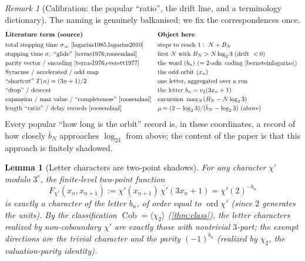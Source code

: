 \documentclass[11pt]{article}
\theoremstyle{plain}
\newtheorem{lemma}{Lemma}
\theoremstyle{definition}
\theoremstyle{remark}
\newtheorem*{remark}{Remark}
\begin{document}
\begin{remark}[Calibration: the popular ``ratio'', the drift line, and a
terminology dictionary]
The naming is genuinely balkanised; we fix the correspondences once.
\[
\renewcommand{\arraystretch}{1.2}
\begin{array}{@{}lll@{}}
\textbf{Literature term (source)} & \textbf{Object here} \\[2pt]
\text{total stopping time }\sigma_\infty\ \text{\cite{lagarias1985,lagarias2010}}
   & \text{steps to reach }1:\ N+B_N \\
\text{stopping time }\sigma,\ \text{``glide''\ \cite{terras1976,roosendaal}}
   & \text{first }N\text{ with }B_N>N\log_23\ (\text{drift }<0) \\
\text{parity vector / encoding \cite{terras1976,everett1977}}
   & \text{the word }(b_n)\ (=\text{$2$-adic coding \cite{bernsteinlagarias}}) \\
\text{Syracuse / accelerated / odd map}
   & \text{the odd orbit }(x_n) \\
\text{``shortcut'' }T(n)=(3n+1)/2
   & \text{one letter, aggregated over a run} \\
\text{``drop'' / descent}
   & \text{the letter }b_n=v_2(3x_n+1) \\
\text{expansion / max value / ``completeness''\ \cite{roosendaal}}
   & \text{excursion }\max_N(B_N-N\log_23) \\
\text{length ``ratio'' / delay records \cite{roosendaal}}
   & \rho=(2-\log_23)/(\bar b_N-\log_23)\ \text{(above)} \\
\end{array}
\]
Every popular ``how long is the orbit'' record is, in these coordinates,
a record of how closely $\bar b_N$ approaches $\log_23$ from above; the
content of the paper is that this approach is finitely shadowed.
\end{remark}

\begin{lemma}[Letter characters are two-point shadows]\label{lem:lettershadow}
For any character $\chi'$ modulo $3^r$, the finite-level two-point
function
\[
F_{\chi'}(x_n,x_{n+1}):=\chi'(x_{n+1})\,\overline{\chi'}(3x_n+1)
=\chi'(2)^{-b_n}
\]
is exactly a character of the letter $b_n$, of order equal to
$\operatorname{ord}\chi'$ (since $2$ generates the units). By the
classification $\operatorname{Cob}=\langle\chi_2\rangle$
(\cref{thm:class}), the letter characters realized by
\emph{non-coboundary} $\chi'$ are exactly those with nontrivial
$3$-part; the exempt directions are the trivial character and the parity
$(-1)^{b_n}$ (realized by $\chi_2$, the valuation-parity identity).
\end{lemma}
\end{document}
